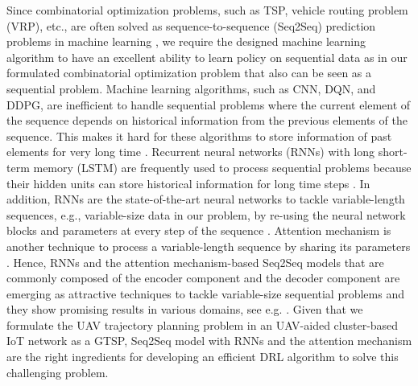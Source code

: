 \documentclass[journal]{IEEEtran}
\begin{document}
     {Since combinatorial optimization problems, such as TSP, vehicle routing problem (VRP), etc., are often solved as sequence-to-sequence (Seq2Seq) prediction problems in machine learning \cite{N. Mazyavkina}, we require the designed machine learning algorithm to have an excellent ability to learn policy on sequential data as in our formulated combinatorial optimization problem that also can be seen as a sequential problem. Machine learning algorithms, such as CNN, DQN, and DDPG, are inefficient to handle sequential problems where the current element of the sequence depends on historical information from the previous elements of the sequence. This makes it hard for these algorithms to store information of past elements for very long time \cite{T. T. Nguyen}. Recurrent neural networks (RNNs) with long short-term memory (LSTM) are frequently used to process sequential problems because their hidden units can store historical information for long time steps \cite{N. Mazyavkina}. In addition, RNNs are the state-of-the-art neural networks to tackle variable-length sequences, e.g., variable-size data in our problem, by re-using the neural network blocks and parameters at every step of the sequence \cite{Y. Bengio}. Attention mechanism is another technique to process a variable-length sequence by sharing its parameters \cite{Y. Bengio}. Hence, RNNs and the attention mechanism-based Seq2Seq models that are commonly composed of the encoder component and the decoder component are emerging as attractive techniques to tackle variable-size sequential problems and they show promising results in various domains, see e.g. \cite{H. Hu, J. Lu, J. J. Q. Yu, K. Li, R. Solozabal, B. Zhu}. Given that we formulate the UAV trajectory planning problem in an UAV-aided cluster-based IoT network as a GTSP, Seq2Seq model with RNNs and the attention mechanism are the right ingredients for developing an efficient DRL algorithm to solve this challenging problem.}

	 	
\end{document}
